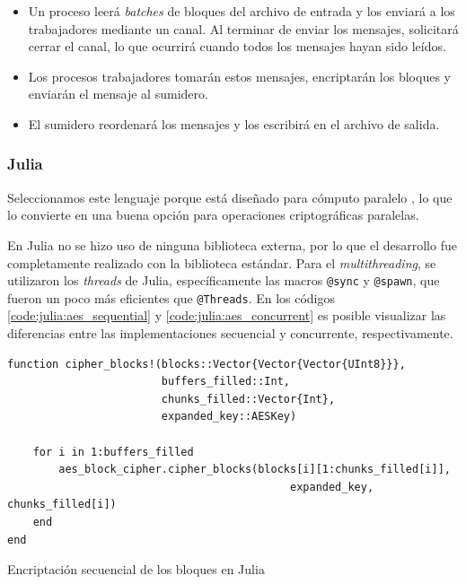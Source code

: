\documentclass[11pt]{article}
\let\Oldsubsubsection\subsubsection
\renewcommand{\subsubsection}{\FloatBarrier\Oldsubsubsection}
\newcommand{\english}[1]{\textit{#1}}
\begin{document}
\begin{itemize}
    \item Un proceso leerá \english{batches} de bloques del archivo de entrada y los enviará a los trabajadores mediante un canal. Al terminar de enviar los mensajes, solicitará cerrar el canal, lo que ocurrirá cuando todos los mensajes hayan sido leídos.
    \item Los procesos trabajadores tomarán estos mensajes, encriptarán los bloques y enviarán el mensaje al sumidero.
    \item El sumidero reordenará los mensajes y los escribirá en el archivo de salida.
\end{itemize}

\subsubsection{Julia}

Seleccionamos este lenguaje porque está diseñado para cómputo paralelo \cite{jl:ex:parallelism}, lo que lo convierte en una buena opción para operaciones criptográficas paralelas.

En Julia no se hizo uso de ninguna biblioteca externa, por lo que el desarrollo fue completamente realizado con la biblioteca estándar. Para el \textit{multithreading}, se utilizaron los \textit{threads} de Julia, específicamente las macros \lstinline{@sync} y \lstinline{@spawn}, que fueron un poco más eficientes que \lstinline{@Threads}. En los códigos \ref{code:julia:aes_sequential} y \ref{code:julia:aes_concurrent} es posible visualizar las diferencias entre las implementaciones secuencial y concurrente, respectivamente.

\begin{listing}[h]
\begin{verbatim}
function cipher_blocks!(blocks::Vector{Vector{Vector{UInt8}}},
                        buffers_filled::Int,
                        chunks_filled::Vector{Int},
                        expanded_key::AESKey)

    for i in 1:buffers_filled
        aes_block_cipher.cipher_blocks(blocks[i][1:chunks_filled[i]],
                                            expanded_key, chunks_filled[i])
    end
end
\end{verbatim}
\caption{Encriptación secuencial de los bloques en Julia}
\label{code:julia:aes_sequential}
\end{listing}
\end{document}
